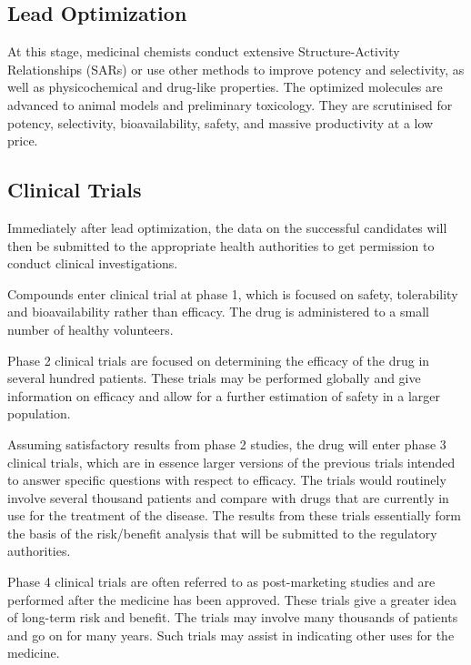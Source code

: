 \subsection{Lead Optimization}

At this stage, medicinal chemists conduct extensive Structure-Activity Relationships (SARs) \citep{328} or use other methods \citep{661,475} to improve potency and selectivity, as well as physicochemical and drug-like properties. The optimized molecules are advanced to animal models and preliminary toxicology. They are scrutinised for potency, selectivity, bioavailability, safety, and massive productivity at a low price.

\subsection{Clinical Trials}

Immediately after lead optimization, the data on the successful candidates will then be submitted to the appropriate health authorities to get permission to conduct clinical investigations.

Compounds enter clinical trial at phase 1, which is focused on safety, tolerability and bioavailability rather than efficacy. The drug is administered to a small number of healthy volunteers.

Phase 2 clinical trials are focused on determining the efficacy of the drug in several hundred patients. These trials may be performed globally and give information on efficacy and allow for a further estimation of safety in a larger population.

Assuming satisfactory results from phase 2 studies, the drug will enter phase 3 clinical trials, which are in essence larger versions of the previous trials intended to answer specific questions with respect to efficacy. The trials would routinely involve several thousand patients and compare with drugs that are currently in use for the treatment of the disease. The results from these trials essentially form the basis of the risk/benefit analysis that will be submitted to the regulatory authorities.

Phase 4 clinical trials are often referred to as post-marketing studies and are performed after the medicine has been approved. These trials give a greater idea of long-term risk and benefit. The trials may involve many thousands of patients and go on for many years. Such trials may assist in indicating other uses for the medicine.

